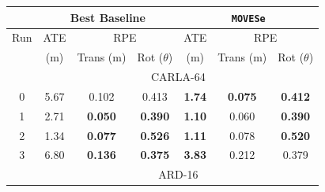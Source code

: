 \documentclass[10pt,twocolumn,letterpaper]{article}
\newcommand{\dslr}{\texttt{\textbf{MOVESe}}}
\begin{document}
\setlength{\tabcolsep}{1.5pt}
\begin{table}[htbp]
\centering
\begin{tabular}{|ccccccc|}
\hline
\multicolumn{1}{|c|}{}           & \multicolumn{3}{c|}{\textbf{Best Baseline}}                                                                                            & \multicolumn{3}{c|}{\dslr{}}                                                                              \\ \hline
\multicolumn{1}{|c|}{Run}        & \multicolumn{1}{c|}{ATE}         & \multicolumn{2}{c|}{RPE}                                                          & \multicolumn{1}{c|}{ATE}            & \multicolumn{2}{c|}{RPE}                                          \\ \hline
\multicolumn{1}{|c|}{}           & \multicolumn{1}{c|}{(m)}         & \multicolumn{1}{c|}{Trans (m)}        & \multicolumn{1}{c|}{Rot ($\theta$)}         & \multicolumn{1}{c|}{(m)}            & \multicolumn{1}{c|}{Trans (m)}      & Rot ($\theta$)                \\ \hline
\multicolumn{1}{|c|}{}           & \multicolumn{6}{c|}{CARLA-64}                                                        \\ \hline
\multicolumn{1}{|c|}{0}          & \multicolumn{1}{c|}{5.67}        & \multicolumn{1}{c|}{0.102}            & \multicolumn{1}{c|}{0.413}                & \multicolumn{1}{c|}{\textbf{1.74}}  & \multicolumn{1}{c|}{\textbf{0.075}} & \textbf{0.412}              \\ \hline
\multicolumn{1}{|c|}{1}          & \multicolumn{1}{c|}{2.71}        & \multicolumn{1}{c|}{\textbf{0.050}}   & \multicolumn{1}{c|}{\textbf{0.390}}       & \multicolumn{1}{c|}{\textbf{1.10}}  & \multicolumn{1}{c|}{0.060}          & \textbf{0.390}              \\ \hline
\multicolumn{1}{|c|}{2}          & \multicolumn{1}{c|}{1.34}        & \multicolumn{1}{c|}{\textbf{0.077}}   & \multicolumn{1}{c|}{\textbf{0.526}}       & \multicolumn{1}{c|}{\textbf{1.11}}  & \multicolumn{1}{c|}{0.078}          & \textbf{0.520}              \\ \hline
\multicolumn{1}{|c|}{3}          & \multicolumn{1}{c|}{6.80}        & \multicolumn{1}{c|}{\textbf{0.136}}   & \multicolumn{1}{c|}{\textbf{0.375}}       & \multicolumn{1}{c|}{\textbf{3.83}}  & \multicolumn{1}{c|}{0.212}          & 0.379                       \\ \hline
\multicolumn{1}{|c|}{}           & \multicolumn{6}{c|}{ARD-16}                      \\ \hline

\end{tabular}
\end{table}
\end{document}
